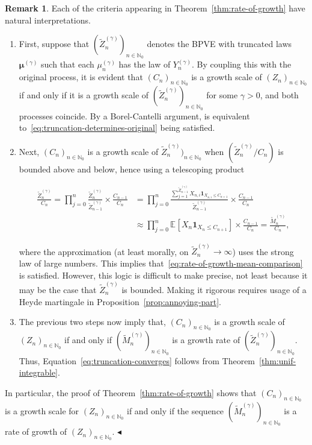 \documentclass[12pt]{article}
\theoremstyle{definition}
\newtheorem{rmq}[thm]{Remark}
\newcommand{\E}[2][]{\ensuremath{\mathbb{E}_{#1}\left[#2 \right]}}
\newcommand{\ensymboldremark }{\hfill$\blacktriangleleft$}
\begin{document}
\begin{rmq}
Each of the criteria appearing in Theorem~\ref{thm:rate-of-growth} have natural interpretations. 
\begin{enumerate}
\item First, suppose that $(\tilde{Z}^{(\gamma)}_{n})_{n \in \mathbb{N}_0}$ denotes the BPVE with truncated laws $\boldsymbol{\mu}^{(\gamma)}$ such that each $\mu_{n}^{(\gamma)}$ has the law of $Y^{(\gamma)}_{n}$. By coupling this with the original process, it is evident that $(C_{n})_{n\in \mathbb{N}_0}$ is a growth scale of $(Z_{n})_{n \in \mathbb{N}_0}$ if and only if it is a growth scale of $(\tilde{Z}^{(\gamma)}_{n})_{n \in \mathbb{N}_0}$ for some $\gamma > 0$, and both processes coincide. By a Borel-Cantelli argument, is equivalent to~\eqref{eq:truncation-determines-original} being satisfied. 
\item Next, $(C_{n})_{n \in \mathbb{N}_0}$ is a growth scale of $\tilde{Z}^{(\gamma)}_{n})_{n \in \mathbb{N}_0}$ when $(\tilde{Z}^{(\gamma)}_{n}/C_{n})$ is bounded above and below, hence using a telescoping product
\begin{linenomath}
\begin{align*}
\frac{\tilde{Z}^{(\gamma)}_{n}}{C_{n}} = \prod_{j=0}^{n} \frac{\tilde{Z}^{(\gamma)}_{n}}{\tilde{Z}^{(\gamma)}_{n-1}} \times \frac{C_{n-1}}{C_{n}} & = \prod_{j=0}^{n} \frac{\sum_{j=1}^{\tilde{Z}^{(\gamma)}_{n-1}} X_{n,i} \mathbf{1}_{X_{n,i} \leq C_{n+1}}}{\tilde{Z}^{(\gamma)}_{n-1}} \times \frac{C_{n-1}}{C_{n}} 
\\ & \approx \prod_{j=0}^{n} \E{X_{n} \mathbf{1}_{X_{n} \leq C_{n+1}}} \times \frac{C_{n-1}}{C_{n}} = \frac{\tilde{M}^{(\gamma)}_{n}}{C_{n}}, 
\end{align*}
\end{linenomath}
where the approximation (at least morally, on $\tilde{Z}^{(\gamma)}_{n} \to \infty$) uses the strong law of large numbers. This implies that~\eqref{eq:rate-of-growth-mean-comparison} is satisfied. However, this logic is difficult to make precise, not least because it may be the case that $\tilde{Z}^{(\gamma)}_{n}$ is bounded. Making it rigorous requires usage of a Heyde martingale in Proposition~\ref{prop:annoying-part}.
\item The previous two steps now imply that, $(C_{n})_{n \in \mathbb{N}_0}$ is a growth scale of $(Z_{n})_{n \in \mathbb{N}_0}$ if and only if $(\tilde{M}^{(\gamma)}_{n})_{n \in \mathbb{N}_0}$ is a growth rate of $(\tilde{Z}^{(\gamma)}_{n})_{n \in \mathbb{N}_0}$. Thus, Equation~\eqref{eq:truncation-converges} follows from Theorem~\ref{thm:unif-integrable}. 
\end{enumerate}
In particular, the proof of Theorem~\ref{thm:rate-of-growth} shows that $(C_{n})_{n \in \mathbb{N}_0}$ is a growth scale for $(Z_{n})_{n \in \mathbb{N}_0}$ if and only if the sequence $(\tilde{M}^{(\gamma)}_{n})_{n \in \mathbb{N}_0}$  is a rate of growth of $(Z_{n})_{n \in \mathbb{N}_0}$. {\small\ensymboldremark }
\end{rmq}
\end{document}
